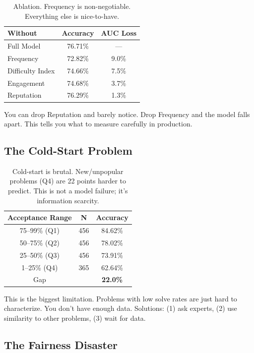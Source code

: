 \documentclass[conference]{IEEEtran}
\begin{document}
\begin{table}[h]
\centering
\small
\begin{tabular}{l|c|c}
\toprule
\textbf{Without} & \textbf{Accuracy} & \textbf{AUC Loss} \\
\midrule
Full Model & 76.71\% & — \\
Frequency & 72.82\% & 9.0\% \\
Difficulty Index & 74.66\% & 7.5\% \\
Engagement & 74.68\% & 3.7\% \\
Reputation & 76.29\% & 1.3\% \\
\bottomrule
\end{tabular}
\caption{Ablation. Frequency is non-negotiable. Everything else is nice-to-have.}
\end{table}

You can drop Reputation and barely notice. Drop Frequency and the model falls apart. This tells you what to measure carefully in production.

\subsection{The Cold-Start Problem}

\begin{table}[h]
\centering
\small
\begin{tabular}{c|c|c}
\toprule
\textbf{Acceptance Range} & \textbf{N} & \textbf{Accuracy} \\
\midrule
75--99\% (Q1) & 456 & 84.62\% \\
50--75\% (Q2) & 456 & 78.02\% \\
25--50\% (Q3) & 456 & 73.91\% \\
1--25\% (Q4) & 365 & 62.64\% \\
\midrule
Gap & & \textbf{22.0\%} \\
\bottomrule
\end{tabular}
\caption{Cold-start is brutal. New/unpopular problems (Q4) are 22 points harder to predict. This is not a model failure; it's information scarcity.}
\end{table}

This is the biggest limitation. Problems with low solve rates are just hard to characterize. You don't have enough data. Solutions: (1) ask experts, (2) use similarity to other problems, (3) wait for data.

\subsection{The Fairness Disaster}
\end{document}
